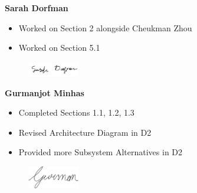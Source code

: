 \textbf{Sarah Dorfman}
\begin{itemize}
    \item Worked on Section 2 alongside Cheukman Zhou
    \item Worked on Section 5.1
\end{itemize}
\begin{figure}[H]
	\centering
	\includegraphics[width=0.2\textwidth]{Signatures/s.png}
\end{figure}

\textbf{Gurmanjot Minhas}
\begin{itemize}
    \item Completed Sections 1.1, 1.2, 1.3 
    \item Revised Architecture Diagram in D2 
    \item Provided more Subsystem Alternatives in D2 
\end{itemize}
\begin{figure}[H]
	\centering
	\includegraphics[width=0.2\textwidth]{Signatures/g.png}
\end{figure}

